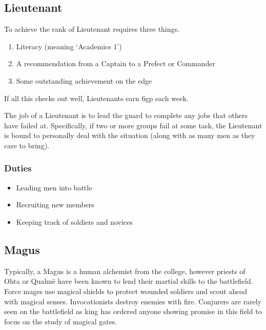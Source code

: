\begin{multicols}{2}
\subsection{Lieutenant}

To achieve the rank of Lieutenant requires three things.

\begin{enumerate}

  \item{Literacy (meaning `Academics 1')}
  \item{A recommendation from a Captain to a Prefect or Commander}
  \item{Some outstanding achievement on the \gls{edge}}

\end{enumerate}

\noindent
If all this checks out well, Lieutenants earn 6gp each week.

The job of a Lieutenant is to lead the \gls{guard} to complete any jobs that others have failed at.
Specifically, if two or more groups fail at some task, the Lieutenant is bound to personally deal with the situation (along with as many men as they care to bring).

\subsubsection{Duties}

\begin{itemize}

  \item{Leading men into battle}
  \item{Recruiting new members}
  \item{Keeping track of soldiers and novices}

\end{itemize}

\subsection{Magus}

Typically, a Magus is a human alchemist from the \gls{college}, however priests of Ohta or Qualm\"e have been known to lend their martial skills to the battlefield.
Force mages use magical shields to protect wounded soldiers and scout ahead with magical senses.
Invocationists destroy enemies with fire.
Conjurers are rarely seen on the battlefield as \gls{king} has ordered anyone showing promise in this field to focus on the study of magical gates.


\end{multicols}
